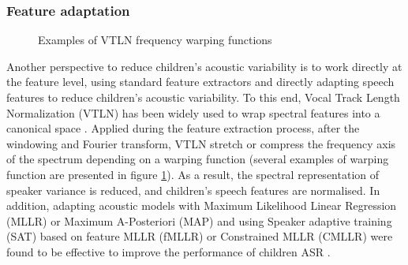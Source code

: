 \subsubsection{Feature adaptation}
\begin{figure}[ht]
\centering
{}
\caption{Examples of  VTLN frequency warping functions}
\label{fig:wfun}
\end{figure}



Another perspective to reduce children's acoustic variability is to work directly at the feature level, using standard feature extractors and directly adapting speech features to reduce children's acoustic variability. To this end, Vocal Track Length Normalization (VTLN) has been widely used to wrap spectral features into a canonical space \cite{VTLN, VTLN2}. Applied during the feature extraction process, after the windowing and Fourier transform, VTLN stretch or compress the frequency axis of the spectrum depending on a warping function (several examples of warping function are presented in figure \ref{fig:wfun}). As a result, the spectral representation of speaker variance is reduced, and children's speech features are normalised.
In addition, adapting acoustic models with Maximum Likelihood Linear Regression (MLLR) or Maximum A-Posteriori (MAP) and using Speaker adaptive training (SAT) based on feature MLLR (fMLLR) or Constrained MLLR (CMLLR) were found to be effective to improve the  performance of children ASR \cite{pronunciation, asr-improved2, children_language_model2, reviewASRchildren}.

